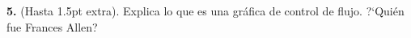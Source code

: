 \textbf{5.} (Hasta 1.5pt extra). Explica lo que es una gr\'afica de control de flujo.
?`Qui\'en fue Frances Allen? 
